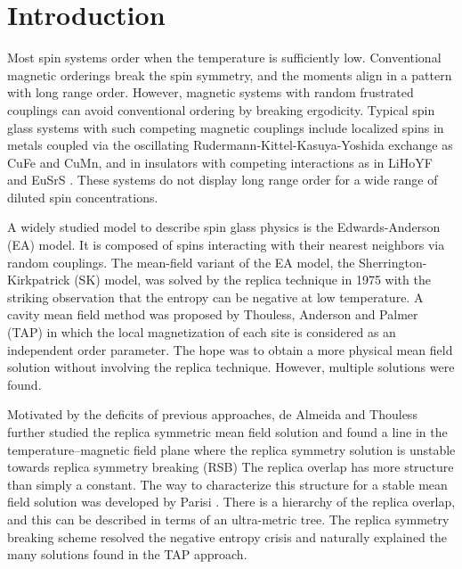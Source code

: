 \documentclass[aps,prb,twocolumn,showpacs,superscriptaddress]{revtex4}
\begin{document}
\section{Introduction} 
Most spin systems order when the temperature is sufficiently low. 
Conventional magnetic orderings break the spin symmetry, and the moments align 
in a pattern with long range order. However, magnetic 
systems with random frustrated couplings can avoid conventional 
ordering by breaking ergodicity. Typical spin glass systems with 
such competing magnetic couplings include localized spins in metals coupled 
via the oscillating Rudermann-Kittel-Kasuya-Yoshida 
exchange as CuFe and CuMn, and in insulators with competing interactions 
as in LiHoYF and EuSrS \cite{Binder-Young-1986,Mydosh-1993,Diep-2004}. These 
systems do not display long range order for a wide range of diluted spin 
concentrations.

A widely studied model to describe spin glass physics is the Edwards-Anderson 
(EA) model\cite{Edwards-Anderson-1975}. It is composed of spins interacting
with their nearest neighbors via random couplings. The mean-field variant of the 
EA model, the Sherrington-Kirkpatrick (SK) model\cite{Sherrington-Kirkpatrick1978,Sherrington-Kirkpatrick-1975},
was solved by the replica technique in 1975 with the striking observation that 
the entropy can be negative at low temperature\cite{Sherrington-Kirkpatrick-1975,Sherrington-Kirkpatrick1978}. 
A cavity mean field method was proposed by Thouless, Anderson 
and Palmer (TAP) in which the local magnetization of each site is considered as 
an independent order parameter\cite{Thouless-Anderson-Palmer-1977}. The hope was to 
obtain a more physical mean field solution without involving the replica technique. 
However, multiple solutions were found\cite{Bray-Moore-1980}.

Motivated by the deficits of previous approaches, de Almeida and Thouless
further studied the replica symmetric mean field solution and found a line 
in the temperature--magnetic field plane where the replica symmetry
solution is unstable towards replica symmetry breaking (RSB) \cite{Almedia-Thouless-1978,Bray-Moore-1978}
The replica overlap has more structure than simply a constant. The way to 
characterize this structure for a stable mean field solution was developed 
by Parisi \cite{Parisi-1980a,Parisi-1980b,Parisi-1980c}.  There is a hierarchy 
of the replica overlap, and this can be described in terms of an ultra-metric tree. 
The replica symmetry breaking scheme resolved the negative entropy crisis and naturally 
explained the many solutions found in the TAP approach.
\end{document}

